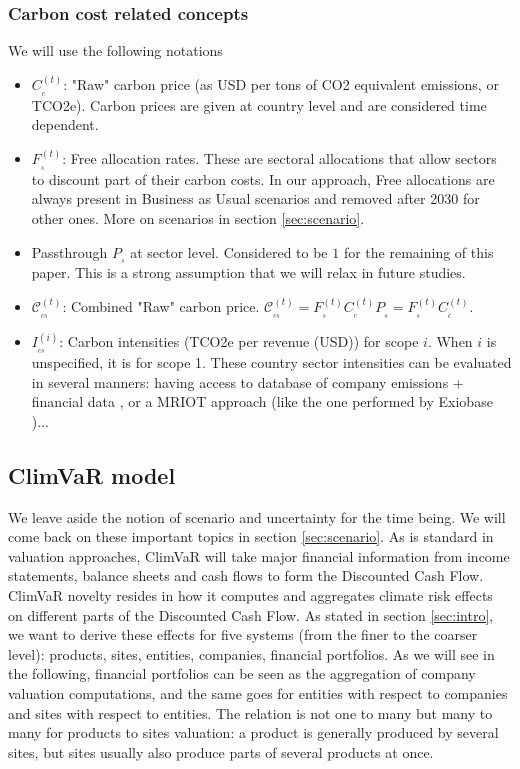 \subsubsection{Carbon cost related concepts}

We will use the following notations

\begin{itemize}
\item[$\bullet$] $C^{(t)}_{_c}$: "Raw" carbon price (as USD per tons of CO2 equivalent emissions, or TCO2e). Carbon prices \cite{WorldBankCC} are given at country level and are considered time dependent.
\item[$\bullet$] $F^{(t)}_{_s}$: Free allocation rates. These are sectoral allocations that allow sectors to discount part of their carbon costs. In our approach, Free allocations are always present in Business as Usual scenarios and removed after 2030 for other ones. More on scenarios in section \ref{sec:scenario}.
\item[$\bullet$] Passthrough $P_{_s}$ at sector level. Considered to be $1$ for the remaining of this paper. This is a strong assumption that we will relax in future studies.
\item[$\bullet$] $\mathcal{C}^{(t)}_{_{cs}}$: Combined "Raw" carbon price. $\mathcal{C}^{(t)}_{_{cs}}=F^{(t)}_{_s}C^{(t)}_{_c}P_{_s}=F^{(t)}_{_s}C^{(t)}_{_c}$.
\item[$\bullet$] $I^{(i)}_{_{cs}}$: Carbon intensities (TCO2e per revenue (USD)) for scope $i$. When $i$ is unspecified, it is for scope 1. These country sector intensities can be evaluated in several manners: having access to database of company emissions + financial data \cite{CDP}, or a MRIOT approach (like the one performed by Exiobase \cite{Exiobase})...
\end{itemize}

\subsection{ClimVaR model} \label{sec:climvar}

We leave aside the notion of scenario and uncertainty for the time being. We will come back on these important topics in section \ref{sec:scenario}. As is standard in valuation approaches, ClimVaR will take major financial information from income statements, balance sheets and cash flows to form the Discounted Cash Flow. ClimVaR novelty resides in how it computes and aggregates climate risk effects on different parts of the Discounted Cash Flow. As stated in section \ref{sec:intro}, we want to derive these effects for five systems (from the finer to the coarser level): products, sites, entities, companies, financial portfolios. As we will see in the following, financial portfolios can be seen as the aggregation of company valuation computations, and the same goes for entities with respect to companies and sites with respect to entities. The relation is not one to many but many to many for products to sites valuation: a product is generally produced by several sites, but sites usually also produce parts of several products at once.


